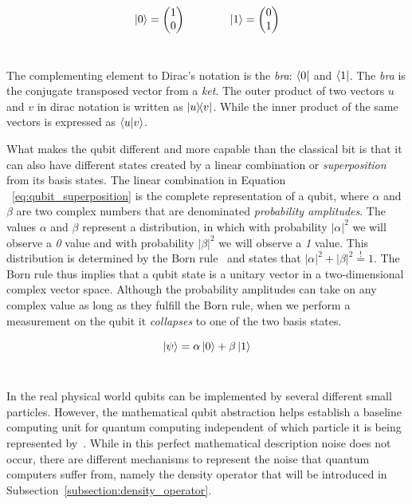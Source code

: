 \begin{equation}\label{eq:qubit_bases}
    \ket{0} = \begin{pmatrix}
                1 \\ 0
              \end{pmatrix} \qquad \qquad
    \ket{1} = \begin{pmatrix}
                0 \\ 1
              \end{pmatrix}
\end{equation} \

The complementing element to Dirac's notation is the \textit{bra}:
\(\bra{0}\) and \(\bra{1}\). The \textit{bra} is the conjugate transposed
vector from a \textit{ket}. The outer product of two vectors \(u\) and
\(v\) in dirac notation is written as \(\ketbra{u}{v}\). While the inner
product of the same vectors is expressed as \(\braket{u}{v}\). \

What makes the qubit different and more capable than
the classical bit is that it can also have different states
created by a linear combination or \textit{superposition} from
its basis states. The linear combination in Equation
~\ref{eq:qubit_superposition} is the complete representation
of a qubit, where \(\alpha\) and \(\beta\) are two complex numbers that
are denominated \textit{probability amplitudes}.
The values \(\alpha\) and \(\beta\) represent a distribution, in which
with probability \(|\alpha|^2\) we will observe a \textit{0}
value and with probability \(|\beta|^2\) we will observe a
\textit{1} value. This distribution is determined by the
Born rule~\cite{born_quantenmechanik_1926} and states that \(|\alpha|^2 + |\beta|^2 \stackrel{!}{=} 1\).
The Born rule thus implies that a qubit state is a unitary vector in
a two-dimensional complex vector space. Although the
probability amplitudes can take on any complex value as long
as they fulfill the Born rule, when we perform a measurement
on the qubit it \textit{collapses} to one of the two basis
states. \

\begin{equation}\label{eq:qubit_superposition}
  \ket{\psi} = \alpha\ket{0} + \beta\ket{1}
\end{equation} \

In the real physical world qubits can be implemented by
several different small particles. However, the mathematical
qubit abstraction helps establish a baseline computing unit
for quantum computing independent of which particle it is
being represented by~\cite{nielsen_quantum_2010}. While in this perfect
mathematical description noise does not occur, there are
different mechanisms to represent the noise that quantum
computers suffer from, namely the density operator that will
be introduced in Subsection~\ref{subsection:density_operator}. \

